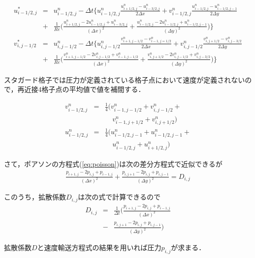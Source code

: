 \documentclass[twocolumn,oneside,a4paper]{article}
\begin{document}
\clearpage
\begin{strip}
\begin{eqnarray}         
     u^\ast_{i-1/2,j} &=& u^n_{i-1/2,j} - \Delta t \Bigg \{u^n_{i-1/2,j}\frac{u^n_{i+1/2,j}-u^n_{i-3/2,j}}{2\Delta x}+ v^n_{i-1/2,j}\frac{u^n_{i-1/2,j}-u^n_{i-1/2,j-1}}{2\Delta y} \nonumber \\
     &+& \frac{1}{Re}\Bigg( \frac{u^n_{i+1/2,j}-2u^n_{i-1/2,j}+u^n_{i-3/2,j}}{(\Delta x)^2}+\frac{u^n_{i-1/2,j}-2u^n_{i-1/2,j}+u^n_{i-1/2,j-1}}{(\Delta y)^2} \Bigg) \Bigg\} \\
     v^\ast_{i,j-1/2} &=& u^n_{i,j-1/2} - \Delta t \Bigg \{u^n_{i,j-1/2}\frac{v^n_{i+1,j-1/2}-v^n_{i-1,j=1/2}}{2\Delta x}+ v^n_{i,j-1/2}\frac{v^n_{i,j+1/2}-v^n_{i,j-3/2}}{2\Delta y} \nonumber \\
     &+& \frac{1}{Re}\Bigg( \frac{v^n_{i+1,j-1/2}-2v^n_{i,j-1/2}+v^n_{i-1,j-1/2}}{(\Delta x)^2}+\frac{v^n_{i,j+1/2}-2v^n_{i,j-1/2}+v^n_{i,j-3/2}}{(\Delta y)^2} \Bigg) \Bigg\}
\end{eqnarray}
\end{strip}

スタガード格子では圧力が定義されている格子点において速度が定義されないので，再近接4格子点の平均値で値を補間する．

\begin{eqnarray*}
 v^n_{i-1/2,j} &=& \frac{1}{4}\bigg(v^n_{i-1,j-1/2}+v^n_{i,j-1/2} +\\
               &&\:\:\:\:\: v^n_{i-1,j+1/2}+v^n_{i,j+1/2}\bigg) \\
 u^n_{i-1/2,j} &=& \frac{1}{4}\bigg(u^n_{i-1/2,j-1}+u^n_{i-1/2,j-1} +\\
               &&\:\:\:\:\: u^n_{i-1/2,j}+u^n_{i+1/2,j}\bigg)
\end{eqnarray*}


さて，ポアソンの方程式(\ref{eq:poisson})は次の差分方程式で近似できるが
\begin{eqnarray*}
	\frac{p_{i+1,j}-2p_{i,j}+p_{i-1,j}}{(\Delta x)^2} + \frac{p_{i,j+1}-2p_{i,j}+p_{i,j-1}}{(\Delta y)^2} = D_{i,j}
\end{eqnarray*}

このうち，拡散係数$D_{i,j}$は次の式で計算できるので
\begin{eqnarray*}
	D_{i,j} &=& \frac{1}{\Delta t}\bigg( \frac{p_{i+1,j}-2p_{i,j}+p_{i-1,j}}{(\Delta x)^2}  \\
	&-& \frac{p_{i,j+1}-2p_{i,j}+p_{i,j-1}}{(\Delta y)^2} \bigg)
\end{eqnarray*}

拡散係数$D$と速度輸送方程式の結果を用いれば圧力$p_{i,j}$が求まる．
\end{document}
